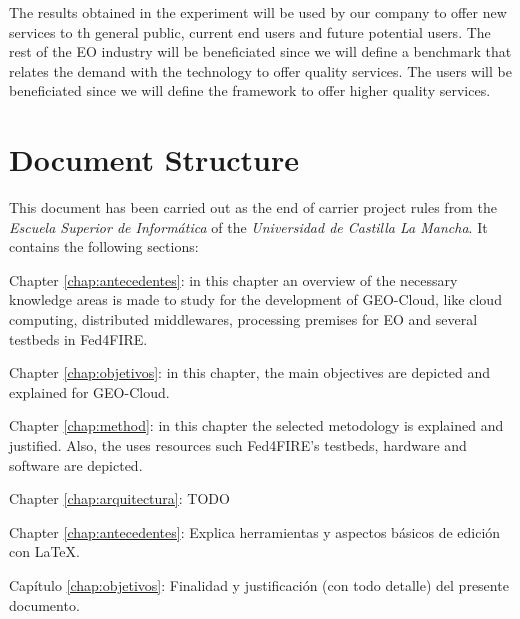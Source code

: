 The results obtained in the experiment will be used by our company to offer new
services to th general public, current end users and future potential users. The
rest of the \ac{EO} industry will be beneficiated since we will define a
benchmark that relates the demand with the technology to offer quality
services. The users will be beneficiated since we will define the framework to
offer higher quality services.




\section{Document Structure}

This document has been carried out as the end of carrier project rules from the \emph{Escuela
Superior de Informática} of the \emph{Universidad de Castilla La Mancha}. It contains
the following sections:


\begin{definitionlist}
\item[Chapter \ref{chap:antecedentes}: \nameref{chap:antecedentes}] in this
  chapter an overview of the necessary knowledge areas is made to study for the
  development of GEO-Cloud, like cloud computing, distributed middlewares,
  processing premises for \ac{EO} and several testbeds in Fed4FIRE.
\item[Chapter \ref{chap:objetivos}: \nameref{chap:objetivos}] in this
  chapter, the main objectives are depicted and explained for GEO-Cloud.
\item[Chapter \ref{chap:method}: \nameref{chap:method}] in this chapter the
  selected metodology is explained and justified. Also, the uses resources such
  Fed4FIRE's testbeds, hardware and software are depicted.
\item[Chapter \ref{chap:arquitectura}: \nameref{chap:arquitectura}] TODO
\item[Chapter \ref{chap:antecedentes}: \nameref{chap:antecedentes}] Explica herramientas
  y aspectos básicos de edición con \LaTeX.
\item[Capítulo \ref{chap:objetivos}: \nameref{chap:objetivos}] Finalidad y justificación
  (con todo detalle) del presente documento.
\end{definitionlist}
